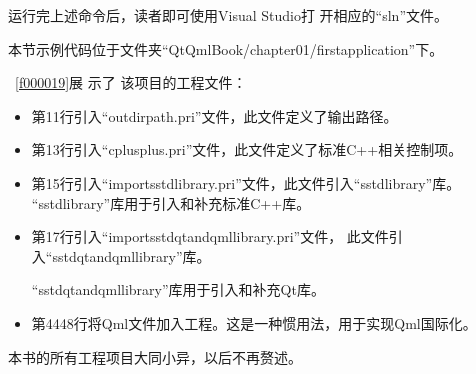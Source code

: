 运行完上述命令后，读者即可使用Visual Studio打
开相应的“sln”文件。

本节示例代码位于文件夹“QtQmlBook/chapter01/firstapplication”下。

\filesourcenumbernameone\ \ref{f000019}展
示了
该项目的工程文件：

\begin{itemize}
\item 第11行引入“outdirpath.pri”文件，此文件定义了输出路径。
\item 第13行引入“cplusplus.pri”文件，此文件定义了标准C{\sourcefonttwo{}+}{\sourcefonttwo{}+}相关控制项。
\item 第15行引入“import\underline{\hspace{0.5em}}sstd\underline{\hspace{0.5em}}library.pri”文件，此文件引入“sstd\underline{\hspace{0.5em}}library”库。
“sstd\underline{\hspace{0.5em}}library”库用于引入和补充标准C{\sourcefonttwo{}+}{\sourcefonttwo{}+}库。
\item 第17行引入“import\underline{\hspace{0.5em}}sstd\underline{\hspace{0.5em}}qt\underline{\hspace{0.5em}}and\underline{\hspace{0.5em}}qml\underline{\hspace{0.5em}}library.pri”文件，
此文件引入“sstd\underline{\hspace{0.5em}}\-qt\underline{\hspace{0.5em}}\-and\underline{\hspace{0.5em}}\-qml\underline{\hspace{0.5em}}\-library”库。

“sstd\underline{\hspace{0.5em}}qt\underline{\hspace{0.5em}}and\underline{\hspace{0.5em}}qml\underline{\hspace{0.5em}}library”库用于引入和补充Qt库。
\item 第44\raisebox{0.16ex}{\sourcefonttwo\~{}}48行将Qml文件加入工程。这是一种惯用法，用于实现Qml国际化。
\end{itemize}

本书的所有工程项目大同小异，以后不再赘述。

